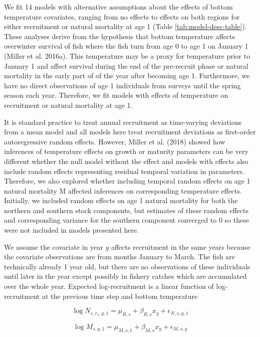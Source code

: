 \documentclass[
]{article}
\begin{document}
We fit 14 models with alternative assumptions about the effects of
bottom temperature covariates, ranging from no effects to effects on
both regions for either recruitment or natural mortality at age 1 (Table
\ref{tab:model-desc-table}). These analyses derive from the hypothesis
that bottom temperature affects overwinter survival of fish where the
fish turn from age 0 to age 1 on January 1 (Miller et al. 2016a). This
temperature may be a proxy for temperature prior to January 1 and affect
survival during the end of the pre-recruit phase or natural mortality in
the early part of of the year after becoming age 1. Furthermore, we have
no direct observations of age 1 individuals from surveys until the
spring season each year. Therefore, we fit models with effects of
temperature on recruitment or natural mortality at age 1.

It is standard practice to treat annual recruitment as time-varying
deviations from a mean model and all models here treat recruitment
deviations as first-order autoregressive random effects. However, Miller
et al. (2018) showed how inferences of temperature effects on growth or
maturity parameters can be very different whether the null model without
the effect and models with effects also include random effects
representing residual temporal variation in parameters. Therefore, we
also explored whether including temporal random effects on age 1 natural
mortality M affected inferences on corresponding temperature effects.
Initially, we included random effects on age 1 natural mortality for
both the northern and southern stock components, but estimates of these
random effects and corresponding variance for the southern component
converged to 0 so these were not included in models presented here.

We assume the covariate in year \(y\) affects recruitment in the same
years because the covariate observations are from months January to
March. The fish are technically already 1 year old, but there are no
observations of these individuals until later in the year except
possibly in fishery catches which are accumulated over the whole year.
Expected log-recruitment is a linear function of log-recruitment at the
previous time step and bottom temperature

\begin{equation}\label{eq:expected-recruitment}
\log N_{s,r_s,y,1} = \mu_{R,s} + \beta_{R,s} x_y + \epsilon_{N,s,y,1}
\end{equation}

\begin{equation}\label{eq:expected-M1}
\log M_{s,y,1} = \mu_{M,s,1} + \beta_{M,s} x_y + \epsilon_{M,s,y}
\end{equation}
\end{document}
